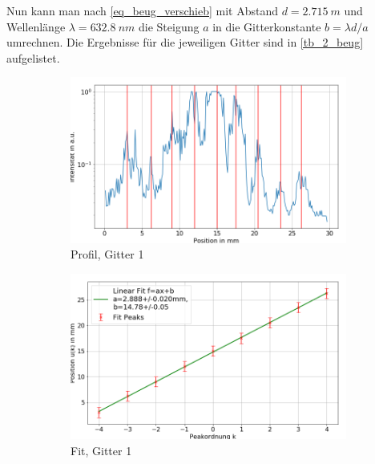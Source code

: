 \documentclass[
	a4paper,
	12pt,
	pagesize,
	ngerman
]{scrartcl}
\begin{document}
 Nun kann man nach \cref{eq_beug_verschieb} mit Abstand $d=\SI{2.715}{m}$ und Wellenlänge $\lambda=\SI{632.8}{nm}$ die Steigung $a$ in die Gitterkonstante $b=\lambda d/a$ umrechnen.
 Die Ergebnisse für die jeweiligen Gitter sind in \cref{tb_2_beug} aufgelistet.

\begin{figure}[H]
        \centering
        \begin{subfigure}[b]{0.475\textwidth}
            \centering
            \includegraphics[width=\textwidth]{img/2/2_gitter_g1}
            \caption%
            {Profil, Gitter 1}
            \label{fig_2_profil_g1}
        \end{subfigure}
        \hfill
        \begin{subfigure}[b]{0.475\textwidth}
            \centering
            \includegraphics[width=\textwidth]{img/2/2_gitter_g1_fit}
            \caption[]%
            {Fit, Gitter 1}
            \label{fig_2_fit_g1}
        \end{subfigure}
        \begin{subfigure}[b]{0.475\textwidth}

\end{subfigure}
\end{figure}
\end{document}
